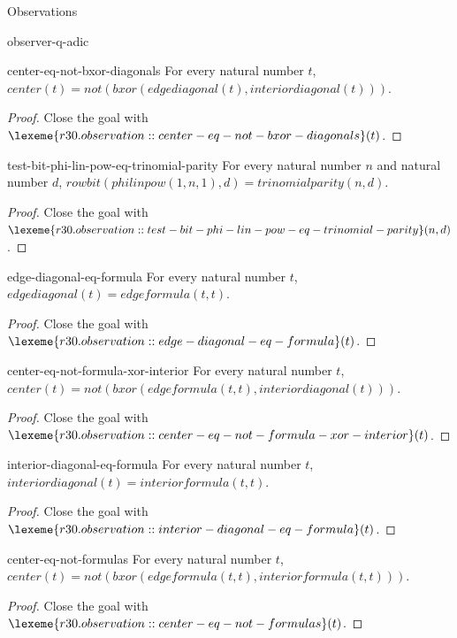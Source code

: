 \begin{lexlean}{Observations}
\begin{section}{observer-q-adic}
\begin{theorem}{center-eq-not-bxor-diagonals}
For every natural number \(t\), \(center(t) = not(bxor(edgediagonal(t), interiordiagonal(t)))\).
\begin{proof}
Close the goal with \(\lexeme{r30.observation::center-eq-not-bxor-diagonals}(t)\).
\end{proof}
\end{theorem}

\begin{theorem}{test-bit-phi-lin-pow-eq-trinomial-parity}
For every natural number \(n\) and natural number \(d\), \(rowbit(philinpow(1, n, 1), d) = trinomialparity(n, d)\).
\begin{proof}
Close the goal with \(\lexeme{r30.observation::test-bit-phi-lin-pow-eq-trinomial-parity}(n, d)\).
\end{proof}
\end{theorem}

\begin{theorem}{edge-diagonal-eq-formula}
For every natural number \(t\), \(edgediagonal(t) = edgeformula(t, t)\).
\begin{proof}
Close the goal with \(\lexeme{r30.observation::edge-diagonal-eq-formula}(t)\).
\end{proof}
\end{theorem}

\begin{theorem}{center-eq-not-formula-xor-interior}
For every natural number \(t\), \(center(t) = not(bxor(edgeformula(t, t), interiordiagonal(t)))\).
\begin{proof}
Close the goal with \(\lexeme{r30.observation::center-eq-not-formula-xor-interior}(t)\).
\end{proof}
\end{theorem}

\begin{theorem}{interior-diagonal-eq-formula}
For every natural number \(t\), \(interiordiagonal(t) = interiorformula(t, t)\).
\begin{proof}
Close the goal with \(\lexeme{r30.observation::interior-diagonal-eq-formula}(t)\).
\end{proof}
\end{theorem}

\begin{theorem}{center-eq-not-formulas}
For every natural number \(t\), \(center(t) = not(bxor(edgeformula(t, t), interiorformula(t, t)))\).
\begin{proof}
Close the goal with \(\lexeme{r30.observation::center-eq-not-formulas}(t)\).
\end{proof}
\end{theorem}


\end{section}
\end{lexlean}
